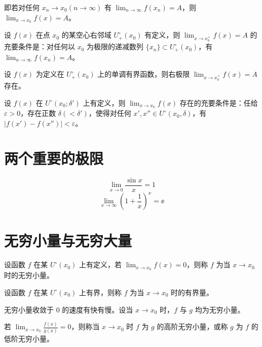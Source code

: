 即若对任何 $x_n\to x_0(n\to \infty)$ 有 $\displaystyle\lim_{n\to \infty}f(x_n) = A$，则 $\displaystyle\lim_{x\to x_0}f(x)=A$。

\begin{theorem}
	设 $f(x)$ 在点 $x_0$ 的某空心右邻域 $U_+^\circ(x_0)$ 有定义，则 $\displaystyle\lim_{x\to x_0^+}f(x)=A$ 的充要条件是：对任何以 $x_0$ 为极限的递减数列 $\{x_n\}\subset U_+^\circ(x_0)$，有 $\displaystyle\lim_{n\to \infty}f(x_n) = A$。
\end{theorem}

\begin{theorem}
	设 $f(x)$ 为定义在 $U_+^\circ(x_0)$ 上的单调有界函数，则右极限 $\displaystyle\lim_{x\to x_0^+}f(x)=A$ 存在。
\end{theorem}

\begin{theorem}[柯西准则]
	设 $f(x)$ 在 $U^\circ(x_0;\delta')$ 上有定义，则 $\displaystyle\lim_{x\to x_0}f(x)$ 存在的充要条件是：任给 $\varepsilon > 0$，存在正数 $\delta(<\delta')$，使得对任何 $x',x''\in U^\circ(x_0,\delta)$，有 $|f(x')-f(x'')|<\varepsilon$。
\end{theorem}

\section{两个重要的极限}

$$\lim_{x\to 0}\frac{\sin x}{x} = 1$$
$$\lim_{x\to \infty}\left(1+\frac{1}{x}\right)^x = \ee$$

\section{无穷小量与无穷大量}

\begin{definition}[无穷小量]
	设函数 $f$ 在某 $U^\circ(x_0)$ 上有定义，若 $\displaystyle\lim_{x\to x_0}f(x)=0$，则称 $f$ 为当 $x\to x_0$ 时的无穷小量。
\end{definition}

\begin{definition}[有界量]
	设函数 $f$ 在某 $U^\circ(x_0)$ 上有界，则称 $f$ 为当 $x\to x_0$ 时的有界量。
\end{definition}

无穷小量收敛于 $0$ 的速度有快有慢。设当 $x\to x_0$ 时，$f$ 与 $g$ 均为无穷小量。

若 $\displaystyle\lim_{x\to x_0}\frac{f(x)}{g(x)} = 0$，则称当 $x\to x_0$ 时 $f$ 为 $g$ 的高阶无穷小量，或称 $g$ 为 $f$ 的低阶无穷小量。

